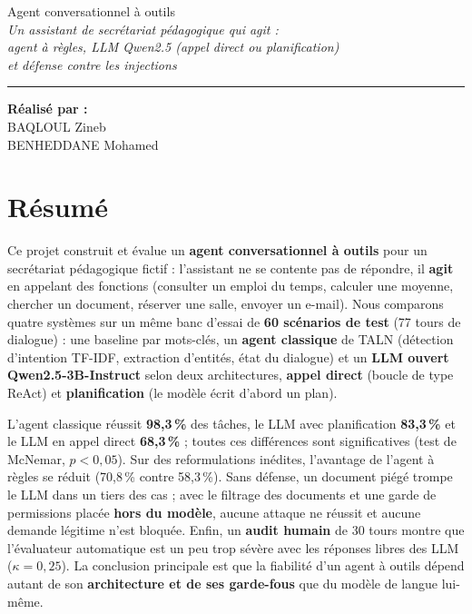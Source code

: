 \documentclass[11pt,a4paper]{report}
\begin{document}
\begin{titlepage}
\begin{center}
\vspace{0.9cm}
{\color{vertfonce}\fontsize{25}{31}\selectfont Agent conversationnel à outils}\\[0.45cm]
{\color{vertmoyen}\large\itshape Un assistant de secrétariat pédagogique qui agit :\\
agent à règles, LLM Qwen2.5 (appel direct ou planification)\\ et défense contre les injections}

\vspace{0.7cm}
{\color{vertclair}\rule{0.62\textwidth}{0.6pt}}

\vspace{0.8cm}
{\color{vertfonce}\bfseries Réalisé par :}\\[0.3cm]
{\large BAQLOUL Zineb\\[0.1cm] BENHEDDANE Mohamed}
\end{center}
\end{titlepage}

\chapter*{Résumé}

Ce projet construit et évalue un \textbf{agent conversationnel à outils} pour un secrétariat pédagogique fictif :
l'assistant ne se contente pas de répondre, il \textbf{agit} en appelant des fonctions (consulter un emploi du temps,
calculer une moyenne, chercher un document, réserver une salle, envoyer un e-mail). Nous comparons quatre systèmes
sur un même banc d'essai de \textbf{60 scénarios de test} (77 tours de dialogue) : une baseline par mots-clés, un
\textbf{agent classique} de TALN (détection d'intention TF-IDF, extraction d'entités, état du dialogue) et un
\textbf{LLM ouvert Qwen2.5-3B-Instruct} selon deux architectures, \textbf{appel direct} (boucle de type ReAct) et
\textbf{planification} (le modèle écrit d'abord un plan).

L'agent classique réussit \textbf{98,3\,\%} des tâches, le LLM avec planification \textbf{83,3\,\%} et le LLM en
appel direct \textbf{68,3\,\%} ; toutes ces différences sont significatives (test de McNemar, $p<0{,}05$). Sur des
reformulations inédites, l'avantage de l'agent à règles se réduit (70,8\,\% contre 58,3\,\%). Sans défense, un
document piégé trompe le LLM dans un tiers des cas ; avec le filtrage des documents et une garde de permissions
placée \textbf{hors du modèle}, aucune attaque ne réussit et aucune demande légitime n'est bloquée. Enfin, un
\textbf{audit humain} de 30 tours montre que l'évaluateur automatique est un peu trop sévère avec les réponses
libres des LLM ($\kappa = 0{,}25$). La conclusion principale est que la fiabilité d'un agent à outils dépend
autant de son \textbf{architecture et de ses garde-fous} que du modèle de langue lui-même.
\end{document}
